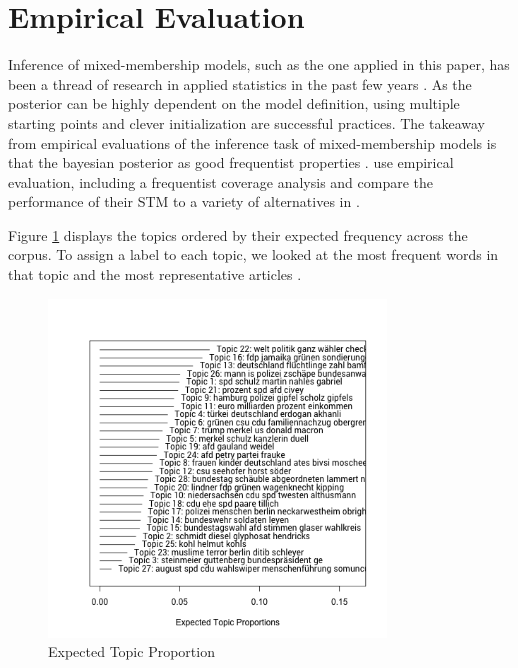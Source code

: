 \documentclass[12pt,a4paper,notitlepage]{article}
\begin{document}
\section{Empirical Evaluation}

Inference of mixed-membership models, such as the one applied in this paper, has been a thread of research in applied statistics in the past few years \citep{blei_latent_2003} \citep{erosheva_mixed-membership_2004} \citep{braun_variational_2010}. As the posterior can be highly dependent on the model definition, using multiple starting points and clever initialization are successful practices. The takeaway from empirical evaluations of the inference task of mixed-membership models is that the bayesian posterior as good frequentist properties \citep{wallach_evaluation_2009}. \citet{roberts_model_2016} use empirical evaluation, including a frequentist coverage analysis and compare the performance of their STM to a variety of alternatives in \citet{roberts_navigating_2016}. 

Figure \ref{fig_topic_proportion} displays the topics ordered by their expected frequency across the corpus. To assign a label to each topic, we looked at the most frequent words in that topic and the most representative articles \citep{roberts_model_2016}.  

\begin{figure}[H]
	\begin{center}
	\includegraphics[width=0.8\textwidth,keepaspectratio]{../figs/topic_proportion.png}
	\caption{Expected Topic Proportion}
	\label{fig_topic_proportion}
	\end{center}
\end{figure}
\end{document}
